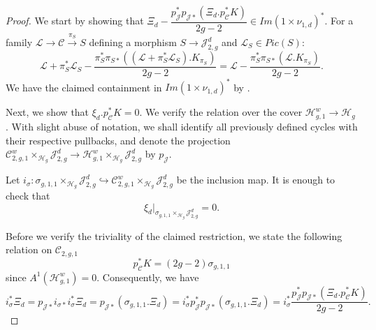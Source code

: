 \documentclass[11pt]{amsart}
\newtheorem{theorem}{Theorem}[section]
\theoremstyle{definition}
\newcommand{\ri}{\rightarrow}
\newcommand{\J}{\mathscr{J}}
\newcommand{\jac}{\mathcal{J}}
\newcommand{\s}{\sigma}
\newcommand{\h}{\mathcal{H}}
\newcommand{\Q}{\mathbb{Q}}
\newcommand{\C}{\mathscr{C}}
\newcommand{\mC}{\mathcal{C}}
\newcommand{\T}{\Theta}
\newcommand{\lb}{\mathcal{L}}
\newcommand{\hr}{\hookrightarrow}
\begin{document}
\begin{proof}
We start by showing that $\Xi_d-\dfrac{p_{\J}^*p_{\J *}(\Xi_d.p_\C^*K)}{2g-2}\in Im(1\times\nu_{1,d})^*$. For a family 
$\lb\ri\C\xrightarrow{\pi_S} S$ defining a morphism $S\ri \jac^d_{2,g}$ and $\lb_S\in Pic(S)$: 
$$\lb+\pi_S^*\lb_S-\dfrac{\pi_{S}^*\pi_{S *}((\lb+\pi_S^*\lb_S).K_{\pi_S})}{2g-2} = \lb-\dfrac{\pi_{S}^*\pi_{S *}(\lb.K_{\pi_S})}{2g-2}.$$
    We have the claimed containment in $Im(1\times\nu_{1,d})^*$ by \cite[Theorem 2.10]{shubham-r2}. 

Next, we show that $\xi_d.p_\mC^*K = 0$. We verify the relation over the cover $\h^w_{g,1}\ri \h_g$.
With slight abuse of notation, we shall identify all previously defined cycles with their respective pullbacks, 
and denote the projection $\mC_{2,g,1}^w\times_{\h_{g}}\J^d_{2,g}\ri \h^w_{g,1}\times_{\h_g}\J^d_{2,g}$ by $p_\J$.

Let $i_\s:\s_{g,1,1}\times_{\h_{g}}\J^d_{2,g}\hr \mC_{2,g,1}^w\times_{\h_g}\J^d_{2,g} $ be the inclusion map.
 It is enough to check that $$\xi_d|_{\s_{g,1,1}\times_{\h_{g}}\J^d_{2,g}} = 0.$$
 
Before we verify the triviality of the claimed restriction, we state the following relation on $\mC_{2,g,1}$ 
$$p_\mC^*K = (2g-2)\s_{g,1,1}$$ 
since $A^1(\h^w_{g,1})=0$. Consequently, we have 
\begin{equation*}i_\s^*\Xi_d = p_{\J *}i_{\s *}i_\s^*\Xi_d = p_{\J *}(\s_{g,1,1}.\Xi_d) = i_{\s}^*p_{\J}^*p_{\J *}(\s_{g,1,1}.\Xi_d)=i_\s^*\dfrac{p_{\J}^*p_{\J *}(\Xi_d.p_\C^*K)}{2g-2}.\end{equation*}
\end{proof}

\end{document}
